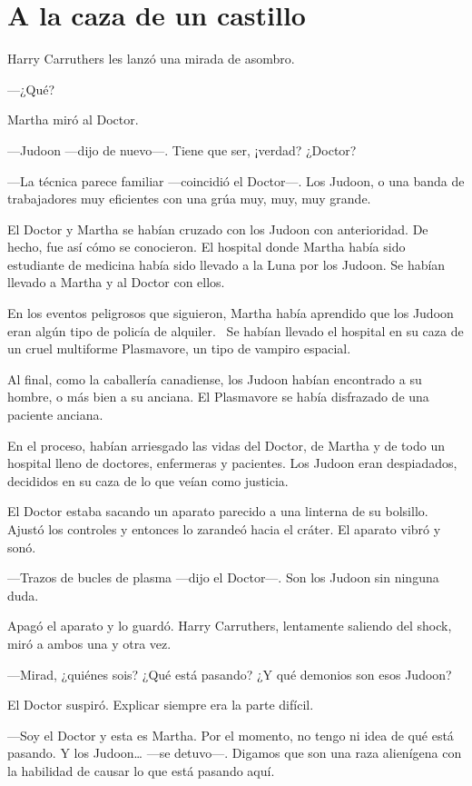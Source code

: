 \chapter*{A la caza de un castillo}

Harry Carruthers les lanzó una mirada de asombro.

---¿Qué?

Martha miró al Doctor.

---Judoon ---dijo de nuevo---. Tiene que ser, ¡verdad? ¿Doctor?

---La técnica parece familiar ---coincidió el Doctor---. Los Judoon, o
una banda de trabajadores muy eficientes con una grúa muy, muy, muy
grande.

El Doctor y Martha se habían cruzado con los Judoon con anterioridad. De
hecho, fue así cómo se conocieron. El hospital donde Martha había sido
estudiante de medicina había sido llevado a la Luna por los Judoon. Se
habían llevado a Martha y al Doctor con ellos.

En los eventos peligrosos que siguieron, Martha había aprendido que los
Judoon eran algún tipo de policía de alquiler. ~Se habían llevado el
hospital en su caza de un cruel multiforme Plasmavore, un tipo de
vampiro espacial.

Al final, como la caballería canadiense, los Judoon habían encontrado a
su hombre, o más bien a su anciana. El Plasmavore se había disfrazado de
una paciente anciana.

En el proceso, habían arriesgado las vidas del Doctor, de Martha y de
todo un hospital lleno de doctores, enfermeras y pacientes. Los Judoon
eran despiadados, decididos en su caza de lo que veían como justicia.

El Doctor estaba sacando un aparato parecido a una linterna de su
bolsillo. Ajustó los controles y entonces lo zarandeó hacia el cráter.
El aparato vibró y sonó.

---Trazos de bucles de plasma ---dijo el Doctor---. Son los Judoon sin
ninguna duda.

Apagó el aparato y lo guardó. Harry Carruthers, lentamente saliendo del
shock, miró a ambos una y otra vez.

---Mirad, ¿quiénes sois? ¿Qué está pasando? ¿Y qué demonios son esos
Judoon?

El Doctor suspiró. Explicar siempre era la parte difícil.

---Soy el Doctor y esta es Martha. Por el momento, no tengo ni idea de
qué está pasando. Y los Judoon\ldots{} ---se detuvo---. Digamos que son
una raza alienígena con la habilidad de causar lo que está pasando aquí.

